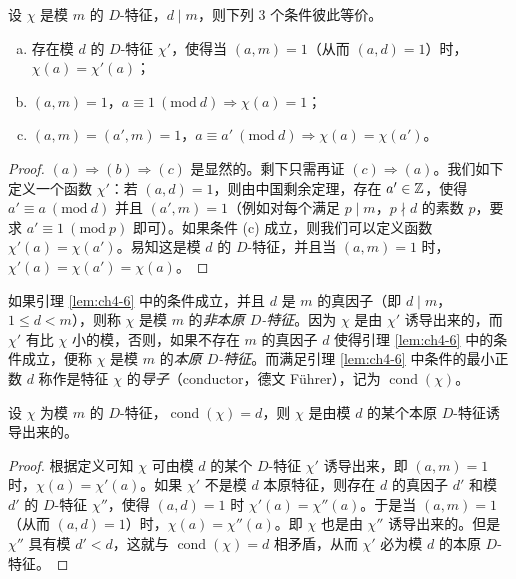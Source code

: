 \begin{lemma}\label{lem:ch4-6}
设 $\chi$ 是模 $m$ 的 $D$-特征，$d\mid m$，则下列 $3$ 个条件彼此等价。
\begin{enumerate}[(a)]
  \item 存在模 $d$ 的 $D$-特征 $\chi'$，使得当 $(a,m)=1$（从而 $(a,d)=1$）时，$\chi(a)=\chi'(a)$；
  \item $(a,m)=1$，$a\equiv 1\ (\mathrm{mod}\ d)\Rightarrow\chi(a)=1$；
  \item $(a,m)=(a',m)=1$，$a\equiv a'\ (\mathrm{mod}\ d)\Rightarrow\chi(a)=\chi(a')$。
\end{enumerate}
\end{lemma}

\begin{proof}
$(a)\Rightarrow(b)\Rightarrow(c)$ 是显然的。剩下只需再证 $(c)\Rightarrow(a)$。我们如下定义一个函数 $\chi'$：若 $(a,d)=1$，则由中国剩余定理，存在 $a'\in\mathbb{Z}$，使得 $a'\equiv a\ (\mathrm{mod}\ d)$ 并且 $(a',m)=1$（例如对每个满足 $p\mid m$，$p\nmid d$ 的素数 $p$，要求 $a'\equiv 1\ (\mathrm{mod}\ p)$ 即可）。如果条件 (c) 成立，则我们可以定义函数 $\chi'(a)=\chi(a')$。易知这是模 $d$ 的 $D$-特征，并且当 $(a,m)=1$ 时，$\chi'(a)=\chi(a')=\chi(a)$。
\end{proof}

\begin{sloppypar}
如果引理 \ref{lem:ch4-6} 中的条件成立，并且 $d$ 是 $m$ 的真因子（即 $d\mid m$，$1\leqslant d<m$），则称 $\chi$ 是模 $m$ 的\emph{非本原 $D$-特征}。因为 $\chi$ 是由 $\chi'$ 诱导出来的，而 $\chi'$ 有比 $\chi$ 小的模，否则，如果不存在 $m$ 的真因子 $d$ 使得引理 \ref{lem:ch4-6} 中的条件成立，便称 $\chi$ 是模 $m$ 的\emph{本原 $D$-特征}。而满足引理 \ref{lem:ch4-6} 中条件的最小正数 $d$ 称作是特征 $\chi$ 的\emph{导子}（conductor，德文 Führer），记为 $\operatorname{cond}(\chi)$。
\end{sloppypar}

\begin{lemma}\label{lem:ch4-7}
设 $\chi$ 为模 $m$ 的 $D$-特征，$\operatorname{cond}(\chi)=d$，则 $\chi$ 是由模 $d$ 的某个本原 $D$-特征诱导出来的。
\end{lemma}

\begin{proof}
根据定义可知 $\chi$ 可由模 $d$ 的某个 $D$-特征 $\chi'$ 诱导出来，即 $(a,m)=1$ 时，$\chi(a)=\chi'(a)$。如果 $\chi'$ 不是模 $d$ 本原特征，则存在 $d$ 的真因子 $d'$ 和模 $d'$ 的 $D$-特征 $\chi''$，使得 $(a,d)=1$ 时 $\chi'(a)=\chi''(a)$。于是当 $(a,m)=1$（从而 $(a,d)=1$）时，$\chi(a)=\chi''(a)$。即 $\chi$ 也是由 $\chi''$ 诱导出来的。但是 $\chi''$ 具有模 $d'<d$，这就与 $\operatorname{cond}(\chi)=d$ 相矛盾，从而 $\chi'$ 必为模 $d$ 的本原 $D$-特征。
\end{proof}

